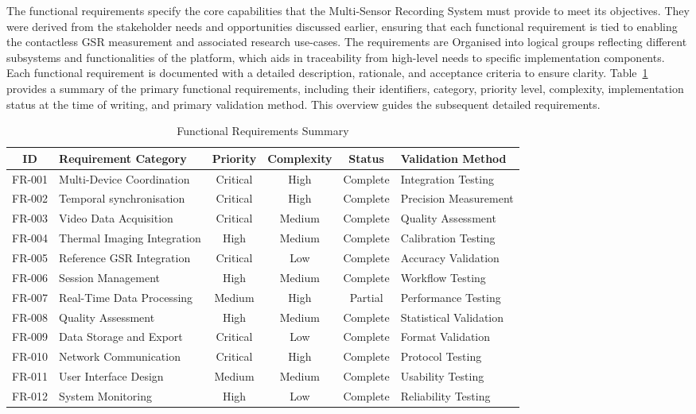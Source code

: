 \documentclass[11pt,a4paper]{report}
\begin{document}
The functional requirements specify the core capabilities that the Multi-Sensor Recording System must provide to meet its objectives. They were derived from the stakeholder needs and opportunities discussed earlier, ensuring that each functional requirement is tied to enabling the contactless GSR measurement and associated research use-cases. The requirements are Organised into logical groups reflecting different subsystems and functionalities of the platform, which aids in traceability from high-level needs to specific implementation components. Each functional requirement is documented with a detailed description, rationale, and acceptance criteria to ensure clarity. Table~\ref{tab:fr_summary} provides a summary of the primary functional requirements, including their identifiers, category, priority level, complexity, implementation status at the time of writing, and primary validation method. This overview guides the subsequent detailed requirements. \begin{table}[h]
\centering
\caption{Functional Requirements Summary}
\label{tab:fr_summary}
\begin{tabular}{c p{3.5cm} c c c p{3.5cm}}
\toprule
\textbf{ID} & \textbf{Requirement Category} & \textbf{Priority} & \textbf{Complexity} & \textbf{Status} & \textbf{Validation Method} \\
\midrule
FR-001 & Multi-Device Coordination & Critical & High & Complete & Integration Testing \\
FR-002 & Temporal synchronisation & Critical & High & Complete & Precision Measurement \\
FR-003 & Video Data Acquisition & Critical & Medium & Complete & Quality Assessment \\
FR-004 & Thermal Imaging Integration & High & Medium & Complete & Calibration Testing \\
FR-005 & Reference GSR Integration & Critical & Low & Complete & Accuracy Validation \\
FR-006 & Session Management & High & Medium & Complete & Workflow Testing \\
FR-007 & Real-Time Data Processing & Medium & High & Partial & Performance Testing \\
FR-008 & Quality Assessment & High & Medium & Complete & Statistical Validation \\
FR-009 & Data Storage and Export & Critical & Low & Complete & Format Validation \\
FR-010 & Network Communication & Critical & High & Complete & Protocol Testing \\
FR-011 & User Interface Design & Medium & Medium & Complete & Usability Testing \\
FR-012 & System Monitoring & High & Low & Complete & Reliability Testing \\
\bottomrule
\end{tabular}
\end{table} %
\end{document}
